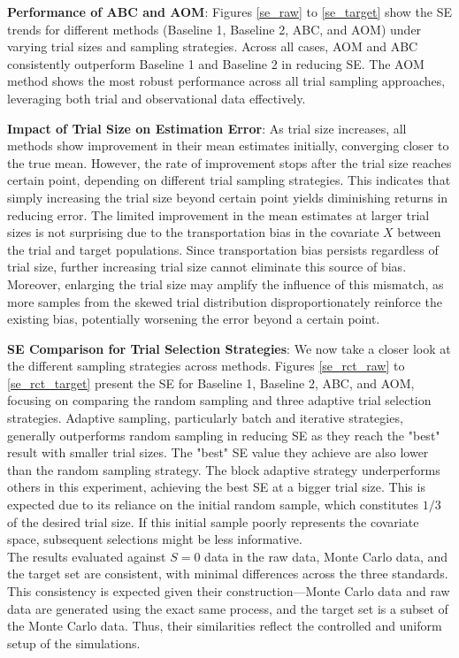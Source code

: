 \documentclass[12pt, oneside]{amsart}
\theoremstyle{definition}
\theoremstyle{remark}
\numberwithin{equation}{section}
\begin{document}
\textbf{Performance of ABC and AOM}: Figures \ref{se_raw} to \ref{se_target} show the SE trends for different methods (Baseline 1, Baseline 2, ABC, and AOM) under varying trial sizes and sampling strategies. Across all cases, AOM and ABC consistently outperform Baseline 1 and Baseline 2 in reducing SE. The AOM method shows the most robust performance across all trial sampling approaches, leveraging both trial and observational data effectively. 

\textbf{Impact of Trial Size on Estimation Error}: As trial size increases, all methods show improvement in their mean estimates initially, converging closer to the true mean. However, the rate of improvement stops after the trial size reaches certain point, depending on different trial sampling strategies. This indicates that simply increasing the trial size beyond certain point yields diminishing returns in reducing error. The limited improvement in the mean estimates at larger trial sizes is not surprising due to the transportation bias in the covariate $X$ between the trial and target populations. Since transportation bias persists regardless of trial size, further increasing trial size cannot eliminate this source of bias. Moreover, enlarging the trial size may amplify the influence of this mismatch, as more samples from the skewed trial distribution disproportionately reinforce the existing bias, potentially worsening the error beyond a certain point.

\textbf{SE Comparison for Trial Selection Strategies}: We now take a closer look at the different sampling strategies across methods. Figures \ref{se_rct_raw} to \ref{se_rct_target} present the SE for Baseline 1, Baseline 2, ABC, and AOM, focusing on comparing the random sampling and three adaptive trial selection strategies. Adaptive sampling, particularly batch and iterative strategies, generally outperforms random sampling in reducing SE as they reach the "best" result with smaller trial sizes. The "best" SE value they achieve are also lower than the random sampling strategy. The block adaptive strategy underperforms others in this experiment, achieving the best SE at a bigger trial size. This is expected due to its reliance on the initial random sample, which constitutes $1/3$ of the desired trial size. If this initial sample poorly represents the covariate space, subsequent selections might be less informative. \\

The results evaluated against $S=0$ data in the raw data, Monte Carlo data, and the target set are consistent, with minimal differences across the three standards. This consistency is expected given their construction—Monte Carlo data and raw data are generated using the exact same process, and the target set is a subset of the Monte Carlo data. Thus, their similarities reflect the controlled and uniform setup of the simulations. 
\end{document}
